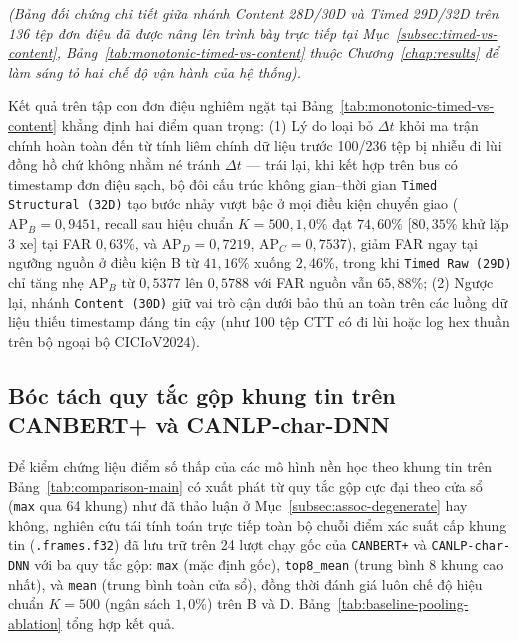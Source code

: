 \documentclass[12pt, a4paper, reqno, oneside]{book}
\DeclareRobustCommand{\code}[1]{\nolinkurl{#1}}
\begin{document}
{\small\setlength{\tabcolsep}{3.5pt}
\textit{(Bảng đối chứng chi tiết giữa nhánh Content 28D/30D và Timed 29D/32D trên 136 tệp đơn điệu đã được nâng lên trình bày trực tiếp tại Mục~\ref{subsec:timed-vs-content}, Bảng~\ref{tab:monotonic-timed-vs-content} thuộc Chương~\ref{chap:results} để làm sáng tỏ hai chế độ vận hành của hệ thống).}

Kết quả trên tập con đơn điệu nghiêm ngặt tại Bảng~\ref{tab:monotonic-timed-vs-content} khẳng định hai điểm quan trọng: (1) Lý do loại bỏ $\Delta t$ khỏi ma trận chính hoàn toàn đến từ tính liêm chính dữ liệu trước 100/236 tệp bị nhiễu đi lùi đồng hồ chứ không nhằm né tránh $\Delta t$ --- trái lại, khi kết hợp trên bus có timestamp đơn điệu sạch, bộ đôi cấu trúc không gian--thời gian \code{Timed Structural (32D)} tạo bước nhảy vượt bậc ở mọi điều kiện chuyển giao ($\text{AP}_B=0{,}9451$, recall sau hiệu chuẩn $K=500, 1{,}0\%$ đạt $74{,}60\%$ [$80{,}35\%$ khử lặp 3 xe] tại FAR $0{,}63\%$, và $\text{AP}_D=0{,}7219$, $\text{AP}_C=0{,}7537$), giảm FAR ngay tại ngưỡng nguồn ở điều kiện B từ $41{,}16\%$ xuống $2{,}46\%$, trong khi \code{Timed Raw (29D)} chỉ tăng nhẹ $\text{AP}_B$ từ $0{,}5377$ lên $0{,}5788$ với FAR nguồn vẫn $65{,}88\%$; (2) Ngược lại, nhánh \code{Content (30D)} giữ vai trò cận dưới bảo thủ an toàn trên các luồng dữ liệu thiếu timestamp đáng tin cậy (như 100 tệp CTT có đi lùi hoặc log hex thuần trên bộ ngoại bộ CICIoV2024).

\subsection{Bóc tách quy tắc gộp khung tin trên CANBERT+ và CANLP-char-DNN}\label{subsec:baseline-pooling-ablation}
Để kiểm chứng liệu điểm số thấp của các mô hình nền học theo khung tin trên Bảng~\ref{tab:comparison-main} có xuất phát từ quy tắc gộp cực đại theo cửa sổ (\code{max} qua 64 khung) như đã thảo luận ở Mục~\ref{subsec:assoc-degenerate} hay không, nghiên cứu tái tính toán trực tiếp toàn bộ chuỗi điểm xác suất cấp khung tin (\code{.frames.f32}) đã lưu trữ trên 24 lượt chạy gốc của \code{CANBERT+} và \code{CANLP-char-DNN} với ba quy tắc gộp: \code{max} (mặc định gốc), \code{top8\_mean} (trung bình 8 khung cao nhất), và \code{mean} (trung bình toàn cửa sổ), đồng thời đánh giá luôn chế độ hiệu chuẩn $K=500$ (ngân sách $1{,}0\%$) trên B và D. Bảng~\ref{tab:baseline-pooling-ablation} tổng hợp kết quả.

}
\end{document}
